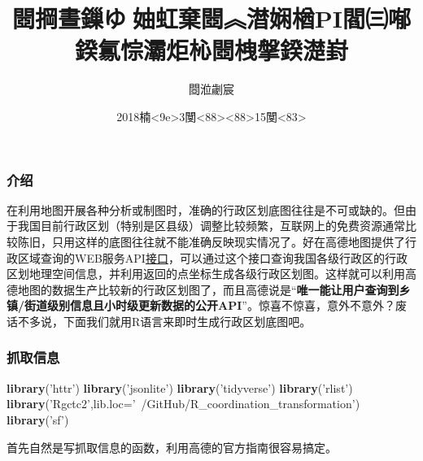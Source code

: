 \documentclass[]{article}
\title{閸掆晝鏁ゆ妯虹棄閸︽澘娴楢PI閻㈢喐鍨氱悰灞炬杺閸栧搫鍨濋崶}
\author{閸涖劌宸}
\date{2018楠\textless{}9e\textgreater{}3閺\textless{}88\textgreater{}\textless{}88\textgreater{}15閺\textless{}83\textgreater{}}
\newenvironment{Shaded}{\begin{snugshade}}{\end{snugshade}}
\newcommand{\KeywordTok}[1]{\textcolor[rgb]{0.13,0.29,0.53}{\textbf{#1}}}
\newcommand{\DataTypeTok}[1]{\textcolor[rgb]{0.13,0.29,0.53}{#1}}
\newcommand{\StringTok}[1]{\textcolor[rgb]{0.31,0.60,0.02}{#1}}
\newcommand{\NormalTok}[1]{#1}
\begin{document}
\maketitle

\subsubsection{介绍}

在利用地图开展各种分析或制图时，准确的行政区划底图往往是不可或缺的。但由于我国目前行政区划（特别是区县级）调整比较频繁，互联网上的免费资源通常比较陈旧，只用这样的底图往往就不能准确反映现实情况了。好在高德地图提供了行政区域查询的WEB服务API\href{http://lbs.amap.com/api/webservice/guide/api/district/}{接口}，可以通过这个接口查询我国各级行政区的行政区划地理空间信息，并利用返回的点坐标生成各级行政区划图。这样就可以利用高德地图的数据生产比较新的行政区划图了，而且高德说是``\textbf{唯一能让用户查询到乡镇/街道级别信息且小时级更新数据的公开API}''。惊喜不惊喜，意外不意外？废话不多说，下面我们就用R语言来即时生成行政区划底图吧。

\subsubsection{抓取信息}

\begin{Shaded}
\begin{Highlighting}[]
\KeywordTok{library}\NormalTok{(}\StringTok{'httr'}\NormalTok{)}
\KeywordTok{library}\NormalTok{(}\StringTok{'jsonlite'}\NormalTok{)}
\KeywordTok{library}\NormalTok{(}\StringTok{'tidyverse'}\NormalTok{)}
\KeywordTok{library}\NormalTok{(}\StringTok{'rlist'}\NormalTok{)}
\KeywordTok{library}\NormalTok{(}\StringTok{'Rgctc2'}\NormalTok{,}\DataTypeTok{lib.loc=}\StringTok{'~/GitHub/R_coordination_transformation'}\NormalTok{)}
\KeywordTok{library}\NormalTok{(}\StringTok{'sf'}\NormalTok{)}
\end{Highlighting}
\end{Shaded}

首先自然是写抓取信息的函数，利用高德的官方指南很容易搞定。
\end{document}

